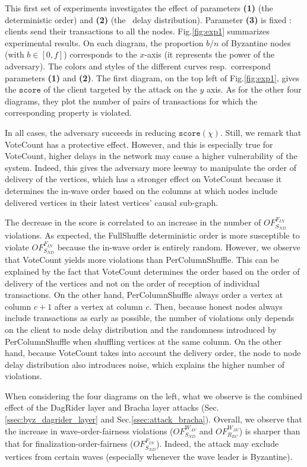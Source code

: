 This first set of experiments investigates the effect of parameters \textbf{(1)} (the deterministic order) and \textbf{(2)} (the \faClockO~delay distribution).
Parameter \textbf{(3)} is fixed : clients send their transactions to all the nodes.
Fig.\ref{fig:exp1} summarizes experimental results.
On each diagram, the proportion $b/n$ of Byzantine nodes (with $b \in [0,f]$) corresponds to the $x$-axis (it represents the power of the adversary). 
The colors and styles of the different curves resp.~correspond parameters \textbf{(1)} and \textbf{(2)}.
The first diagram, on the top left of Fig.\ref{fig:exp1}, gives the $\mathtt{score}$ of the client targeted by the attack on the $y$ axis.
As for the other four diagrams, they plot the number of pairs of transactions for which the corresponding property is violated.

In all cases, the adversary succeeds in reducing $\mathtt{score}(\chi)$.
Still, we remark that VoteCount has a protective effect.
However, and this is especially true for VoteCount, higher delays in the network may cause a higher vulnerability of the system.
Indeed, this gives the adversary more leeway to manipulate the order of delivery of the vertices, which has a stronger effect on VoteCount because it determines the in-wave order based on the columns at which nodes include delivered vertices in their latest vertices' causal sub-graph.

The decrease in the score is correlated to an increase in the number of $OF_{S_{ND}}^{F_{IN}}$ violations.
As expected, the FullShuffle deterministic order is more susceptible to violate $OF_{S_{ND}}^{F_{IN}}$ because the in-wave order is entirely random.
However, we observe that VoteCount yields more violations than PerColumnShuffle.
This can be explained by the fact that VoteCount determines the order based on the order of delivery of the vertices and not on the order of reception of individual transactions.
On the other hand, PerColumnShuffle always order a vertex at column $c+1$ after a vertex at column $c$.
Then, because honest nodes always include transactions as early as possible, the number of violations only depends on the client to node delay distribution and the randomness introduced by PerColumnShuffle when shuffling vertices at the same column.
On the other hand, because VoteCount takes into account the delivery order, the node to node \faClockO delay distribution also introduces noise, which explains the higher number of violations.

When considering the four diagrams on the left, what we observe is the combined effect of the DagRider layer and Bracha layer attacks (Sec.\ref{ssec:byz_dagrider_layer} and Sec.\ref{ssec:attack_bracha}).
Overall, we observe that the increase in wave-order-fairness violations ($OF_{S_{ND}}^{W_{AV}}$ and $OF_{R_{EC}}^{W_{AV}}$) is sharper than that for finalization-order-fairness ($OF_{S_{ND}}^{F_{IN}}$).
Indeed, the attack may exclude vertices from certain waves (especially whenever the wave leader is Byzantine).

